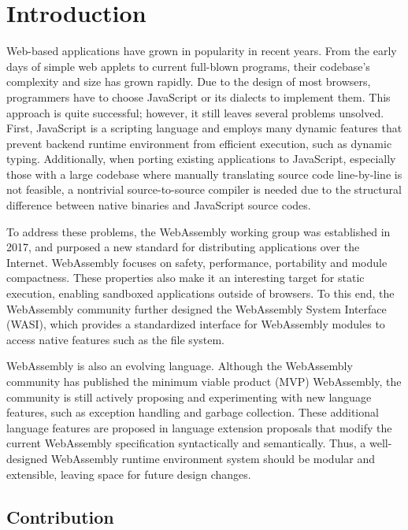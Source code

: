 \chapter{Introduction}
\label{chapter:introduction}

Web-based applications have grown in popularity in recent years. From the early
days of simple web applets to current full-blown programs, their codebase's
complexity and size has grown rapidly. Due to the design of most browsers,
programmers have to choose JavaScript or its dialects to implement them. This
approach is quite successful; however, it still leaves several problems
unsolved. First, JavaScript is a scripting language and employs many dynamic
features that prevent backend runtime environment from efficient execution,
such as dynamic typing. Additionally, when porting existing applications to
JavaScript, especially those with a large codebase where manually translating
source code line-by-line is not feasible, a nontrivial source-to-source
compiler is needed due to the structural difference between native binaries and
JavaScript source codes.

To address these problems, the WebAssembly working group was established in
2017, and purposed a new standard for distributing applications over the
Internet. WebAssembly focuses on safety, performance, portability and module
compactness. These properties also make it an interesting target for static
execution, enabling sandboxed applications outside of browsers. To this end,
the WebAssembly community further designed the WebAssembly System Interface
(WASI), which provides a standardized interface for WebAssembly modules to
access native features such as the file system.

WebAssembly is also an evolving language. Although the WebAssembly community
has published the minimum viable product (MVP) WebAssembly, the community is
still actively proposing and experimenting with new language features, such as
exception handling and garbage collection. These additional language features
are proposed in language extension proposals that modify the current WebAssembly
specification syntactically and semantically. Thus, a well-designed WebAssembly
runtime environment system should be modular and extensible, leaving space for
future design changes.

\section{Contribution}


